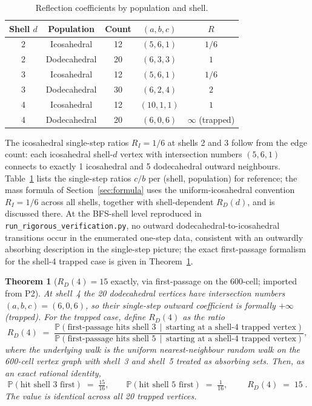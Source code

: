 \documentclass[12pt]{article}
\newtheorem{theorem}{Theorem}
\begin{document}
\begin{table}[ht]
\centering
\caption{Reflection coefficients by population and shell.}
\label{tab:reflection}
\begin{tabular}{@{}ccccc@{}}
\toprule
Shell $d$ & Population & Count & $(a,b,c)$ & $R$ \\
\midrule
2 & Icosahedral & 12 & $(5,6,1)$ & $1/6$ \\
2 & Dodecahedral & 20 & $(6,3,3)$ & $1$ \\
3 & Icosahedral & 12 & $(5,6,1)$ & $1/6$ \\
3 & Dodecahedral & 30 & $(6,2,4)$ & $2$ \\
4 & Icosahedral & 12 & $(10,1,1)$ & $1$ \\
4 & Dodecahedral & 20 & $(6,0,6)$ & $\infty$ (trapped) \\
\bottomrule
\end{tabular}
\end{table}

The icosahedral single-step ratios $R_I = 1/6$ at shells 2 and 3 follow from the edge count: each icosahedral shell-$d$ vertex with intersection numbers $(5, 6, 1)$ connects to exactly 1 icosahedral and 5 dodecahedral outward neighbours. Table~\ref{tab:reflection} lists the single-step ratios $c/b$ per (shell, population) for reference; the mass formula of Section~\ref{sec:formula} uses the uniform-icosahedral convention $R_I = 1/6$ across all shells, together with shell-dependent $R_D(d)$, and is discussed there. At the BFS-shell level reproduced in \texttt{run\_rigorous\_verification.py}, no outward dodecahedral-to-icosahedral transitions occur in the enumerated one-step data, consistent with an outwardly absorbing description in the single-step picture; the exact first-passage formalism for the shell-4 trapped case is given in Theorem~\ref{thm:RD4}.

\begin{theorem}[$R_D(4) = 15$ exactly, via first-passage on the 600-cell; imported from P2]\label{thm:RD4}
At shell~4 the 20 dodecahedral vertices have intersection numbers $(a,b,c) = (6,0,6)$, so their single-step outward coefficient is formally $+\infty$ (trapped). For the trapped case, define $R_D(4)$ as the ratio
\begin{equation}
    R_D(4) \;=\; \frac{\mathbb{P}(\text{first-passage hits shell 3} \,\mid\, \text{starting at a shell-4 trapped vertex})}{\mathbb{P}(\text{first-passage hits shell 5} \,\mid\, \text{starting at a shell-4 trapped vertex})},
\end{equation}
where the underlying walk is the uniform nearest-neighbour random walk on the 600-cell vertex graph with shell~3 and shell~5 treated as absorbing sets. Then, as an exact rational identity,
\begin{equation}
    \mathbb{P}(\text{hit shell 3 first}) \;=\; \tfrac{15}{16}, \qquad
    \mathbb{P}(\text{hit shell 5 first}) \;=\; \tfrac{1}{16}, \qquad
    \boxed{\; R_D(4) \;=\; 15 \;.}
\end{equation}
The value is identical across all 20 trapped vertices.
\end{theorem}
\end{document}

